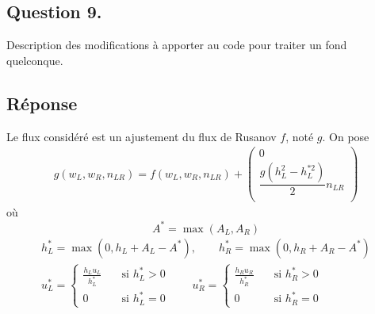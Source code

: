 \documentclass[
	french,
	11pt, %
]{fphw}
\newcommand{\myvec}[3]{\begin{pmatrix} #1  \\ #2 \\ #3 \end{pmatrix}}   %
\begin{document}
\subsection*{Question 9.}

\begin{problem}
	Description des modifications à apporter au code pour traiter un fond quelconque.
\end{problem}

\subsection*{Réponse} 
Le flux considéré est un ajustement du flux de Rusanov $f$, noté $g$. On pose
\begin{align*}
	g(w_L,w_R, n_{LR}) = f(w_L,w_R, n_{LR}) + \myvec{0}{\dfrac{g(h_L^2 - h_L^{*2})}{2}n_{LR}}{}
\end{align*}
où $$A^* = \max(A_L, A_R)$$
\begin{align*}
	h_L^* = \max(0,h_L+A_L-A^*), \qquad h_R^* = \max(0,h_R+A_R-A^*) \\
	u_L^* = \begin{cases}
		\frac{h_Lu_L}{h_L^*} &\quad \text{si } h_L^*>0 \\
		0 &\quad \text{si } h_L^*=0
	\end{cases}	\qquad 	u_R^* = \begin{cases}
		\frac{h_Ru_R}{h_R^*} &\quad \text{si } h_R^*>0 \\
		0 &\quad \text{si } h_R^*=0
	\end{cases}
\end{align*}
\end{document}
